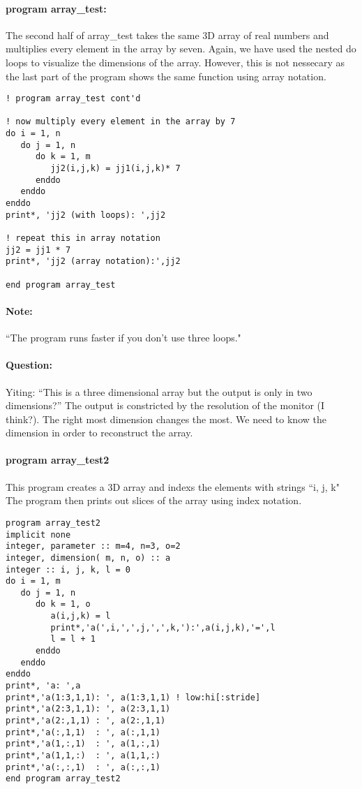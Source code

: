 \documentclass[11pt]{article}
\begin{document}
\paragraph{program array\_test:}	The second half of array\_test takes the same 3D array of real numbers and multiplies every element in the array by seven. Again, we have used the nested do loops to visualize the dimensions of the array. However, this is not nessecary as the last part of the program shows the same function using array notation.\\

\begin{lstlisting}
! program array_test cont'd

! now multiply every element in the array by 7
do i = 1, n
   do j = 1, n
      do k = 1, m
         jj2(i,j,k) = jj1(i,j,k)* 7
      enddo
   enddo
enddo
print*, 'jj2 (with loops): ',jj2

! repeat this in array notation
jj2 = jj1 * 7
print*, 'jj2 (array notation):',jj2

end program array_test
\end{lstlisting}

\paragraph{Note:}``The program runs faster if you don't use three loops."
\paragraph{Question:}Yiting: ``This is a three dimensional array but the output is only in two dimensions?''
The output is constricted by the resolution of the monitor (I think?). The right most dimension changes the most. We need to know the dimension in order to reconstruct the array.
\vfill

\paragraph{program array\_test2}This program creates a 3D array and indexs the elements with strings ``i, j, k" The program then prints out slices of the array using index notation.\\

\begin{lstlisting}
program array_test2
implicit none
integer, parameter :: m=4, n=3, o=2
integer, dimension( m, n, o) :: a
integer :: i, j, k, l = 0
do i = 1, m
   do j = 1, n
      do k = 1, o
         a(i,j,k) = l
         print*,'a(',i,',',j,',',k,'):',a(i,j,k),'=',l
         l = l + 1
      enddo
   enddo
enddo
print*, 'a: ',a
print*,'a(1:3,1,1): ', a(1:3,1,1) ! low:hi[:stride]
print*,'a(2:3,1,1): ', a(2:3,1,1) 
print*,'a(2:,1,1) : ', a(2:,1,1)  
print*,'a(:,1,1)  : ', a(:,1,1)   
print*,'a(1,:,1)  : ', a(1,:,1)   
print*,'a(1,1,:)  : ', a(1,1,:)   
print*,'a(:,:,1)  : ', a(:,:,1)   
end program array_test2
\end{lstlisting}
\end{document}
